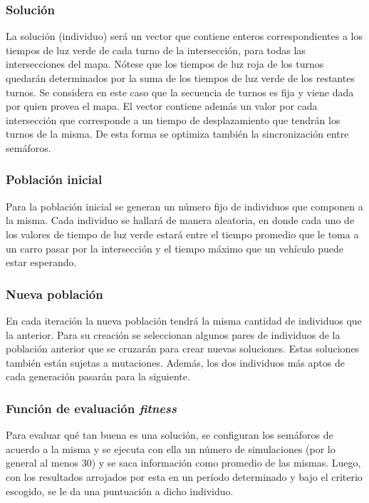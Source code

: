 \documentclass[colorinlistoftodos,twoside,twocolumn]{article} %
\begin{document}
	\subsubsection{Solución}
	
	La solución (individuo) será un vector que contiene enteros correspondientes a los tiempos de luz verde de cada turno de la intersección, para todas las intersecciones del mapa. N\'otese que los tiempos de luz roja de los turnos quedar\'an determinados por la suma de los tiempos de luz verde de los restantes turnos. Se considera en este caso que la secuencia de turnos es fija y viene dada por quien provea el mapa. El vector contiene adem\'as un valor por cada intersecci\'on que corresponde a un tiempo de desplazamiento que tendr\'an los turnos de la misma. De esta forma se optimiza tambi\'en la sincronizaci\'on entre sem\'aforos. 
	
	\subsubsection{Población inicial}
	
	Para  la población inicial se generan un n\'umero fijo de individuos que componen a la misma. Cada individuo se hallará de manera aleatoria, en donde cada uno de los valores de tiempo de luz verde estará entre el tiempo promedio que le toma a un carro pasar por la intersección y el tiempo máximo que un vehículo puede estar esperando. 
	
	\subsubsection{Nueva población}
	En cada iteraci\'on la nueva poblaci\'on tendr\'a la misma cantidad de individuos que la anterior. Para su creaci\'on se seleccionan algunos pares de individuos de la poblaci\'on anterior que se cruzar\'an para crear nuevas soluciones. Estas soluciones tambi\'en est\'an sujetas a mutaciones. Adem\'as, los dos individuos m\'as aptos de cada generaci\'on pasar\'an para la siguiente.  
	
	\subsubsection{Función de evaluación \textit{fitness}}
	
	Para evaluar qu\'e tan buena es una soluci\'on, se configuran los sem\'aforos de acuerdo a la misma y se ejecuta con ella un n\'umero de simulaciones (por lo general al menos 30) y se saca informaci\'on como promedio de las mismas. Luego, con los resultados arrojados por esta en un per\'iodo determinado y bajo el criterio escogido, se le da una puntuaci\'on a dicho individuo.
	
\end{document}
